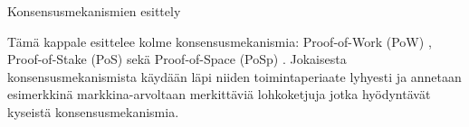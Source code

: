 \begin{chapter}{Konsensusmekanismien esittely\label{esittely}}
\begin{otherlanguage}{finnish}

Tämä kappale esittelee kolme konsensusmekanismia: Proof-of-Work (PoW) \cite{satoshibitcoin}, Proof-of-Stake (PoS) \cite{peercoin-whitepaper} sekä Proof-of-Space (PoSp) \cite{spacemint-whitepaper}. Jokaisesta konsensusmekanismista käydään läpi niiden toimintaperiaate lyhyesti ja annetaan esimerkkinä markkina-arvoltaan merkittäviä lohkoketjuja jotka hyödyntävät kyseistä konsensusmekanismia.





\end{otherlanguage}
\end{chapter}